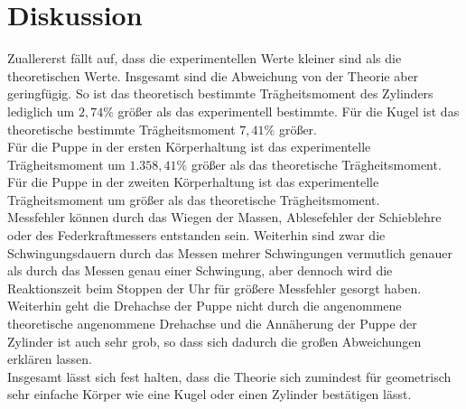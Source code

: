\newpage
\section{Diskussion}
\label{sec:Diskussion}
Zuallererst fällt auf, dass die experimentellen Werte kleiner sind als die theoretischen Werte.
Insgesamt sind die Abweichung von der Theorie aber geringfügig. So ist das theoretisch bestimmte Trägheitsmoment
des Zylinders lediglich um $2{,}74\%$ größer als das experimentell bestimmte. Für die Kugel ist das theoretische bestimmte 
Trägheitsmoment $7{,}41\%$ größer.\\
Für die Puppe in der ersten Körperhaltung ist das experimentelle Trägheitsmoment um $1.358{,}41 \%$ größer als das theoretische Trägheitsmoment.
Für die Puppe in der zweiten Körperhaltung ist das experimentelle Trägheitsmoment um  größer als das theoretische Trägheitsmoment.\\
Messfehler können durch das Wiegen der Massen, Ablesefehler der Schieblehre oder des Federkraftmessers entstanden sein. Weiterhin sind zwar die
Schwingungsdauern durch das Messen mehrer Schwingungen vermutlich genauer als durch das Messen genau einer Schwingung, aber dennoch wird die Reaktionszeit beim 
Stoppen der Uhr für größere Messfehler gesorgt haben.\\
Weiterhin geht die Drehachse der Puppe nicht durch die angenommene theoretische angenommene Drehachse und die Annäherung der Puppe der Zylinder ist auch sehr grob,
so dass sich dadurch die großen Abweichungen erklären lassen.\\
Insgesamt lässt sich fest halten, dass die Theorie sich zumindest für geometrisch sehr einfache Körper wie eine Kugel oder einen Zylinder bestätigen lässt.

\newpage

